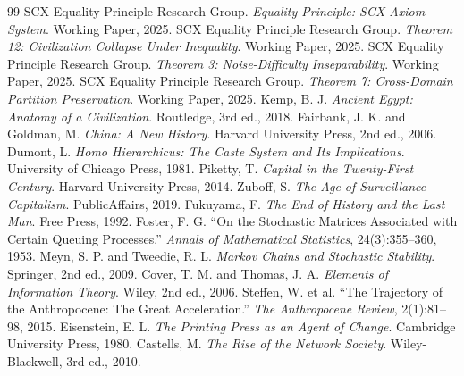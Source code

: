 \documentclass[11pt,a4paper]{article}
\theoremstyle{definition}
\newcommand{\eqtheory}{Equality Principle}
\begin{document}
\begin{thebibliography}{99}
SCX \eqtheory{} Research Group.
\textit{Equality Principle: SCX Axiom System}.
Working Paper, 2025.
SCX \eqtheory{} Research Group.
\textit{Theorem 12: Civilization Collapse Under Inequality}.
Working Paper, 2025.
SCX \eqtheory{} Research Group.
\textit{Theorem 3: Noise-Difficulty Inseparability}.
Working Paper, 2025.
SCX \eqtheory{} Research Group.
\textit{Theorem 7: Cross-Domain Partition Preservation}.
Working Paper, 2025.
Kemp, B. J.
\textit{Ancient Egypt: Anatomy of a Civilization}.
Routledge, 3rd ed., 2018.
Fairbank, J. K. and Goldman, M.
\textit{China: A New History}.
Harvard University Press, 2nd ed., 2006.
Dumont, L.
\textit{Homo Hierarchicus: The Caste System and Its Implications}.
University of Chicago Press, 1981.
Piketty, T.
\textit{Capital in the Twenty-First Century}.
Harvard University Press, 2014.
Zuboff, S.
\textit{The Age of Surveillance Capitalism}.
PublicAffairs, 2019.
Fukuyama, F.
\textit{The End of History and the Last Man}.
Free Press, 1992.
Foster, F. G.
``On the Stochastic Matrices Associated with Certain Queuing Processes.''
\textit{Annals of Mathematical Statistics}, 24(3):355--360, 1953.
Meyn, S. P. and Tweedie, R. L.
\textit{Markov Chains and Stochastic Stability}.
Springer, 2nd ed., 2009.
Cover, T. M. and Thomas, J. A.
\textit{Elements of Information Theory}.
Wiley, 2nd ed., 2006.
Steffen, W. et al.
``The Trajectory of the Anthropocene: The Great Acceleration.''
\textit{The Anthropocene Review}, 2(1):81--98, 2015.
Eisenstein, E. L.
\textit{The Printing Press as an Agent of Change}.
Cambridge University Press, 1980.
Castells, M.
\textit{The Rise of the Network Society}.
Wiley-Blackwell, 3rd ed., 2010.
\end{thebibliography}
\end{document}
